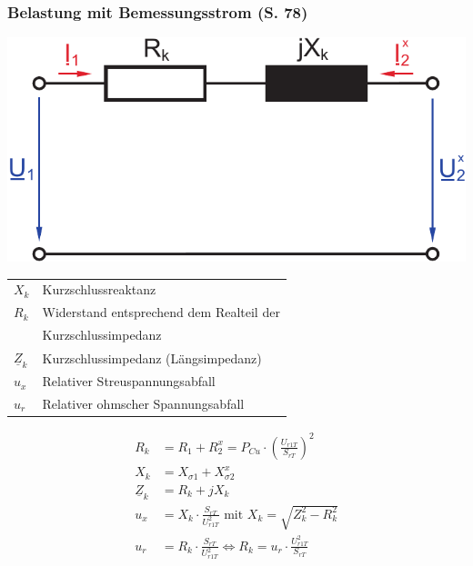 \documentclass[a4paper,twocolumn,10pt]{article}
\begin{document}
\subsubsection{Belastung mit Bemessungsstrom (S. 78)}
\begin{center}
\includegraphics[width=0.6\columnwidth]{Grafiken/Trafo_BS_ESB}
\end{center}
\begin{tabular}{ll}
	$X_k$ & Kurzschlussreaktanz\\
	$R_k$ & Widerstand entsprechend dem Realteil der\\
	& Kurzschlussimpedanz\\
	$\underline{Z}_k$ & Kurzschlussimpedanz (Längsimpedanz)\\
	$u_x$ & Relativer Streuspannungsabfall\\
	$u_r$ & Relativer ohmscher Spannungsabfall
\end{tabular}
\begin{equation*}
\begin{split}
R_k&=R_1+R_2^x= P_{Cu}\cdot\left(\frac{U_{r1T}}{S_{rT}}\right)^2\\
X_k&=X_{\sigma 1}+X_{\sigma 2}^x\\
\underline{Z}_k&=R_k+jX_k\\
u_x&=X_k\cdot\frac{S_{rT}}{U_{r1T}^2}\text{ mit } X_k=\sqrt{Z_k^2-R_k^2}\\
u_r&=R_k\cdot\frac{S_{rT}}{U_{r1T}^2} \Longleftrightarrow R_k=u_r\cdot\frac{U_{r1T}^2}{S_{rT}}
\end{split}
\end{equation*}

\newpage
\end{document}
